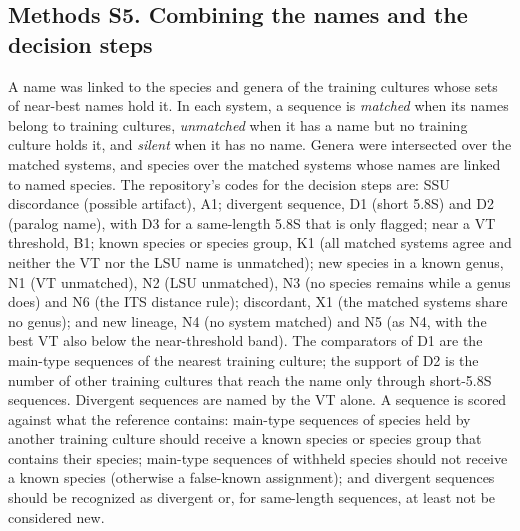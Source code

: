 \documentclass[11pt]{article}
\begin{document}
\subsection*{Methods S5. Combining the names and the decision steps}
A name was linked to the species and genera of the training cultures whose sets of near-best names hold it. In each
system, a sequence is \emph{matched} when its names belong to training cultures, \emph{unmatched} when it has a name
but no training culture holds it, and \emph{silent} when it has no name. Genera were intersected over the matched
systems, and species over the matched systems whose names are linked to named species. The repository's codes for
the decision steps are: SSU discordance (possible artifact), A1; divergent sequence, D1 (short 5.8S) and D2 (paralog
name), with D3 for a same-length 5.8S that is only flagged; near a VT threshold, B1; known species or species group,
K1 (all matched systems agree and neither the VT nor the LSU name is unmatched); new species in a known genus, N1 (VT
unmatched), N2 (LSU unmatched), N3 (no species remains while a genus does) and N6 (the ITS distance rule);
discordant, X1 (the matched systems share no genus); and new lineage, N4 (no system matched) and N5 (as N4, with the
best VT also below the near-threshold band). The comparators of D1 are the main-type sequences of the nearest training
culture; the support of D2 is the number of other training cultures that reach the name only through short-5.8S
sequences. Divergent sequences are named by the VT alone. A sequence is scored against what the reference contains:
main-type sequences of species held by another training culture should receive a known species or species group
that contains their species; main-type sequences of withheld species should not receive a known species (otherwise a
false-known assignment); and divergent sequences should be recognized as divergent or, for same-length sequences, at
least not be considered new.
\end{document}
